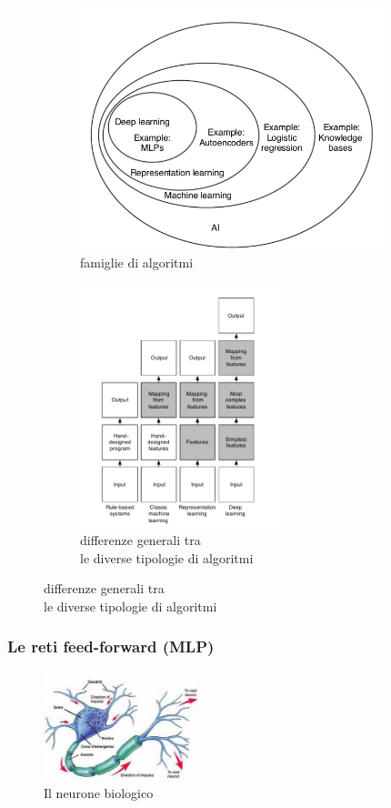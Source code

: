 \documentclass[10pt,a4paper]{article}
\begin{document}
\begin{figure}[h!]
  \centering
  \begin{subfigure}[t]{0.45\linewidth}
  	\centering
    \includegraphics[height=200pt]{AI_venn_diagram.png}
    \caption*{famiglie di algoritmi}
  \end{subfigure}
  \begin{subfigure}[t]{0.45\linewidth}
  	\centering
    \includegraphics[height=200pt]{diff_between_aprochs.png}
    \caption*{differenze generali tra \\ le diverse tipologie di algoritmi}
  \end{subfigure}
  \label{fig:graph1}
\end{figure}

\subsubsection{Le reti feed-forward (MLP)}

\begin{figure}
	\centering
	\vspace{-25pt}
    \includegraphics[width=0.4\textwidth]{neurone.jpg}
  	\caption{Il neurone biologico}
  	\label{fig:graph2}
  	\vspace{-20pt}
\end{figure}
\end{document}
